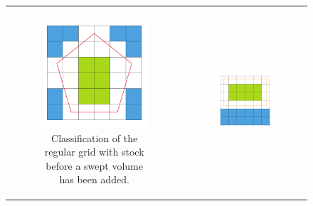 \begin{figure}[h]
	\centering
	\begin{tabular}{cc}
		\begin{subfigure}[t]{0.3\textwidth}
			\centering
			\includegraphics[width=\textwidth]{images/classification_before}
			\caption{Classification of the regular grid with stock before a swept volume has been added.}
			\label{fig:classification_before}
		\end{subfigure}&
		\begin{subfigure}[t]{0.3\textwidth}
			\centering
			\includegraphics[width=\textwidth]{images/classification_sv}

\end{subfigure}
\end{tabular}
\end{figure}
